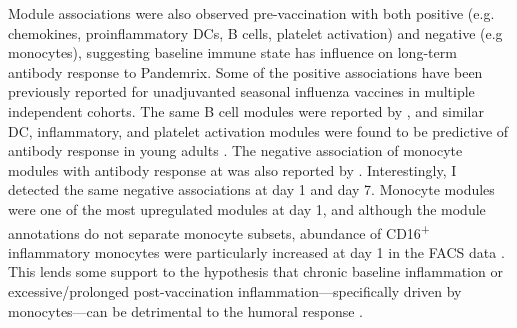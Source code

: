 Module associations were also observed pre-vaccination with both positive (e.g. chemokines, proinflammatory \glspl{DC}, B cells, platelet activation) and negative (e.g monocytes), suggesting baseline immune state has influence on long-term antibody response to Pandemrix.
Some of the positive associations have been previously reported for unadjuvanted seasonal influenza vaccines in multiple independent cohorts.
The same B cell modules were reported by \textcite{nakaya2015SystemsAnalysisImmunity}, 
and similar \gls{DC}, inflammatory, and platelet activation modules were found to be predictive of antibody response in young adults \autocite{hipc-chisignaturesprojectteam2017MulticohortAnalysisReveals}.
The negative association of monocyte modules with antibody response at was also reported by \textcite{nakaya2015SystemsAnalysisImmunity}.
Interestingly, I detected the same negative associations at day 1 and day 7.
Monocyte modules were one of the most upregulated modules at day 1,
and although the module annotations do not separate monocyte subsets,
abundance of CD16\textsuperscript{+} inflammatory monocytes were particularly increased at day 1 in the \gls{FACS} data \autocite{sobolev2016AdjuvantedInfluenzaH1N1Vaccination}.
This lends some support to the hypothesis that chronic baseline inflammation or excessive/prolonged post-vaccination inflammation---specifically driven by monocytes---can be detrimental to the humoral response \autocite{mitchell2012SuppressionVaccineImmunity,mohanty2015ProlongedProinflammatoryCytokine,nakaya2015SystemsAnalysisImmunity}.

%

